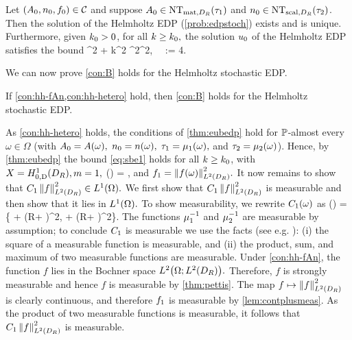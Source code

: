 \noindent Let $(A_{0},n_{0},f_{0}) \in \mathcal C$ and suppose $\Az \in \NTA{\consto}$ and $\nz \in \NTn{\constt}$. Then the solution of the Helmholtz EDP (\cref{prob:edpstoch}) exists and is unique. Furthermore, given $k_{0} > 0$, for all $k \geq k_{0},$ the solution $u_{0}$ of the Helmholtz EDP satisfies the bound 
\beq\label{eq:heterobound1}
\consto \NLtDR{\grad \uz}^2 + \constt k^2 \NLtDR{\uz}^2\leq \Co \NLtDR{\fz}^2,\,\,  \,\, \Co := 4.
\eeq
\enth

We can now prove \cref{con:B} holds for the Helmholtz stochastic EDP.

\label{lem:hh-B}
If \cref{con:hh-fAn,con:hh-hetero} hold, then \cref{con:B} holds for the Helmholtz stochastic EDP.
\ele

As \cref{con:hh-hetero} holds,  the conditions of \cref{thm:eubedp} hold for $\mathbb P$-almost every $\omega \in \Omega$ (with $A_{0} = A(\omega),$ $n_{0} = n(\omega),$ $\tau_{1} = \mu_{1}(\omega),$ and $\tau_{2} = \mu_{2}(\omega)$). Hence, by \cref{thm:eubedp} the bound \eqref{eq:sbe1} holds for all $k \geq k_{0}$, with $X = \HozDDR, m=1,$
\beqs
\Co(\omega) = ,
\eeqs
and $\fo = \NLtDR{f(\omega)}^2.$ It now remains to show that $\Co\,\NLtDR{f}^2 \in \LoO.$ We first show that $\Co\,\NLtDR{f}^2$ is measurable and then show that it lies in $\LoO.$ To show measurability, we rewrite $C_{1}(\omega)$ as 
\beqs
\Co(\omega) =  \max\left\{ + \left(R+ \right)^2, + \left(R+ \right)^2\right\}.
\eeqs
The functions $\mu_{1}^{-1}$ and $\mu_{2}^{-1}$ are measurable by assumption; to conclude $C_{1}$ is measurable we use the facts (see e.g. \cite[Theorems 19.C, 20.A]{Ha:74}): (i) the square of a measurable function is measurable, and (ii) the product, sum, and maximum of two measurable functions are measurable. Under 
\cref{con:hh-fAn}, the function $f$ lies in the Bochner space $\LtOLtDR.$ Therefore, $f$ is strongly measurable and hence $f$ is measurable  by \cref{thm:pettis}. The map $f\mapsto\NLtDR{f}^2$ is clearly continuous, and therefore $f_{1}$ is measurable by \cref{lem:contplusmeas}. As the product of two measurable functions is measurable, it follows that $\Co\,\NLtDR{f}^2$ is measurable.

